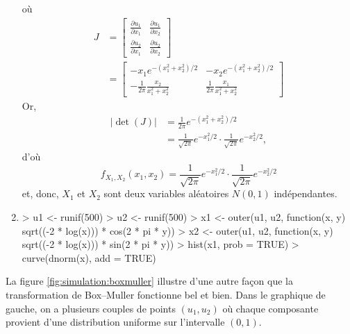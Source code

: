 \begin{exercice}
\begin{sol}
\begin{enumerate}
\begin{displaymath}
      \end{displaymath}%
      où
      \begin{align*}
        J
        &=
        \begin{bmatrix}
          \frac{\partial u_1}{\partial x_1} &
          \frac{\partial u_1}{\partial x_2} \\
          \frac{\partial u_2}{\partial x_1} &
          \frac{\partial u_2}{\partial x_2}
        \end{bmatrix} \\
        &=
        \begin{bmatrix}
          -x_1 e^{- (x_1^2 + x_2^2)/2} &
          -x_2 e^{- (x_1^2 + x_2^2)/2} \\
          -\frac{1}{2\pi} \frac{x_2}{x_1^2 + x_2^2} &
          \frac{1}{2\pi} \frac{x_1}{x_1^2 + x_2^2}
        \end{bmatrix}
      \end{align*}
      Or,
      \begin{align*}
        |\det(J)|
        &= \frac{1}{2\pi} e^{-(x_1^2 + x_2^2)/2} \\
        &= \frac{1}{\sqrt{2\pi}} e^{-x_1^2/2} \cdot
        \frac{1}{\sqrt{2\pi}} e^{-x_2^2/2},
      \end{align*}
      d'où
      \begin{displaymath}
        f_{X_1,X_2}(x_1, x_2) = \frac{1}{\sqrt{2\pi}} e^{-x_1^2/2} \cdot
        \frac{1}{\sqrt{2\pi}} e^{-x_2^2/2}
      \end{displaymath}
      et, donc, $X_1$ et $X_2$ sont deux variables aléatoires $N(0, 1)$
      indépendantes.
    \item
\begin{Schunk}
\begin{Sinput}
> u1 <- runif(500)
> u2 <- runif(500)
> x1 <- outer(u1, u2, function(x, y) sqrt((-2 * log(x))) * cos(2 * pi * y))
> x2 <- outer(u1, u2, function(x, y) sqrt((-2 * log(x))) * sin(2 * pi * y))
> hist(x1, prob = TRUE)
> curve(dnorm(x), add = TRUE)
\end{Sinput}
\end{Schunk}
    \end{enumerate}
    La figure \ref{fig:simulation:boxmuller} illustre d'une autre façon que la
    transformation de Box--Muller fonctionne bel et bien. Dans le
    graphique de gauche, on a plusieurs couples de points $(u_1, u_2)$
    où chaque composante provient d'une distribution uniforme sur
    l'intervalle $(0, 1)$.


\end{sol}
\end{exercice}
